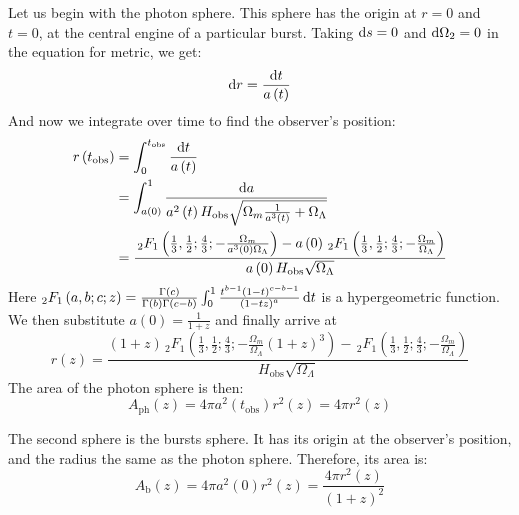 \documentclass[manuscript]{aastex}
\begin{document}
Let us begin with the photon sphere. This sphere has the origin at $r = 0$ and $t = 0$, at the central engine of a particular burst. Taking $\dif s = 0$ and $\dif \Omega_2 = 0$ in the equation for metric, we get:
\begin{equation*}
\dif r = \frac{\dif t}{a\left(t\right)}
\end{equation*}
And now we integrate over time to find the observer's position:
\begin{align*}
r\left(t_\text{obs}\right) &= \int_0^{t_\text{obs}}\frac{\dif t}{a\left(t\right)} \\
&= \int_{a\left(0\right)}^1\frac{\dif a}{a^2\left(t\right) H_\text{obs} \sqrt{\Omega_m\frac{1}{a^3\left(t\right)} + \Omega_\Lambda}} \\
&= \frac{\, _2F_1\left(\frac{1}{3},\frac{1}{2};\frac{4}{3};-\frac{\Omega_m}{a^3\left(0\right) \Omega_\Lambda }\right)-a\left(0\right) \, _2F_1\left(\frac{1}{3},\frac{1}{2};\frac{4}{3};-\frac{\Omega_m}{\Omega_\Lambda }\right)}{a\left(0\right) H_\text{obs} \sqrt{\Omega_\Lambda }}
\end{align*}
Here $_2F_1\left(a, b; c; z\right) =
\frac{\Gamma\left(c\right)}{\Gamma\left(b\right)\Gamma\left(c-b\right)}\int_0^1
\frac{t^{b-1}\left(1-t\right)^{c-b-1}}{\left(1-t z\right)^a} \dif t$
is a hypergeometric function. We then substitute $a\left(0\right) =
\frac{1}{1+z}$ and finally arrive at
\begin{equation}
r\left(z\right) = \frac{\left(1+z\right)\, _2F_1\left(\frac{1}{3},\frac{1}{2};\frac{4}{3};-\frac{\Omega_m}{\Omega_\Lambda}\left(1+z\right)^3\right) - \, _2F_1\left(\frac{1}{3},\frac{1}{2};\frac{4}{3};-\frac{\Omega_m}{\Omega_\Lambda }\right)}{H_\text{obs} \sqrt{\Omega_\Lambda }}
\end{equation}
The area of the photon sphere is then:
\begin{equation}
A_\text{ph}\left(z\right) = 4 \pi a^2\left(t_\text{obs}\right) r^2\left(z\right) = 4 \pi r^2\left(z\right)
\end{equation}

The second sphere is the bursts sphere. It has its origin at the
observer's position, and the radius the same as the photon
sphere. Therefore, its area is:
\begin{equation}
A_\text{b}\left(z\right) = 4 \pi a^2\left(0\right) r^2\left(z\right) = \frac{4 \pi r^2\left(z\right)}{\left(1+z\right)^2}
\end{equation}
\end{document}
